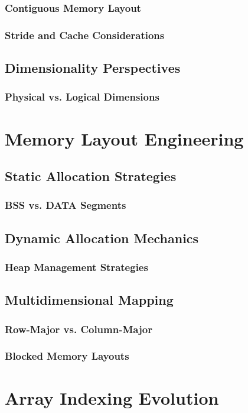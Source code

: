 \documentclass[12pt, oneside]{book}
\begin{document}
	 \subsection{Contiguous Memory Layout}
	 \subsection{Stride and Cache Considerations}
	 \section{Dimensionality Perspectives}
	 \subsection{Physical vs. Logical Dimensions}
	 
	 \chapter{Memory Layout Engineering}
	 \section{Static Allocation Strategies}
	 \subsection{BSS vs. DATA Segments}
	 \section{Dynamic Allocation Mechanics}
	 \subsection{Heap Management Strategies}
	 \section{Multidimensional Mapping}
	 \subsection{Row-Major vs. Column-Major}
	 \subsection{Blocked Memory Layouts}
	 
	 \chapter{Array Indexing Evolution}
\end{document}
